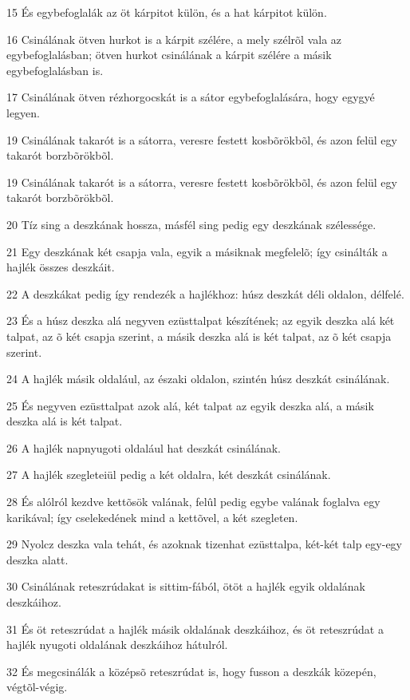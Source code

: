\par 15 És egybefoglalák az öt kárpitot külön, és a hat kárpitot külön.
\par 16 Csinálának ötven hurkot is a kárpit szélére, a mely szélrõl vala az egybefoglalásban; ötven hurkot csinálának a kárpit szélére a másik egybefoglalásban is.
\par 17 Csinálának ötven rézhorgocskát is a sátor egybefoglalására, hogy egygyé legyen.
\par 19 Csinálának takarót is a sátorra, veresre festett kosbõrökbõl, és azon felül egy takarót borzbõrökbõl.
\par 19 Csinálának takarót is a sátorra, veresre festett kosbõrökbõl, és azon felül egy takarót borzbõrökbõl.
\par 20 Tíz sing a deszkának hossza, másfél sing pedig egy deszkának szélessége.
\par 21 Egy deszkának két csapja vala, egyik a másiknak megfelelõ; így csinálták a hajlék összes deszkáit.
\par 22 A deszkákat pedig így rendezék a hajlékhoz: húsz deszkát déli oldalon, délfelé.
\par 23 És a húsz deszka alá negyven ezüsttalpat készítének; az egyik deszka alá két talpat, az õ két csapja szerint, a másik deszka alá is két talpat, az õ két csapja szerint.
\par 24 A hajlék másik oldalául, az északi oldalon, szintén húsz deszkát csinálának.
\par 25 És negyven ezüsttalpat azok alá, két talpat az egyik deszka alá, a másik deszka alá is két talpat.
\par 26 A hajlék napnyugoti oldalául hat deszkát csinálának.
\par 27 A hajlék szegleteiül pedig a két oldalra, két deszkát csinálának.
\par 28 És alólról kezdve kettõsök valának, felûl pedig egybe valának foglalva egy karikával; így cselekedének mind a kettõvel, a két szegleten.
\par 29 Nyolcz deszka vala tehát, és azoknak tizenhat ezüsttalpa, két-két talp egy-egy deszka alatt.
\par 30 Csinálának reteszrúdakat is sittim-fából, ötöt a hajlék egyik oldalának deszkáihoz.
\par 31 És öt reteszrúdat a hajlék másik oldalának deszkáihoz, és öt reteszrúdat a hajlék nyugoti oldalának deszkáihoz hátulról.
\par 32 És megcsinálák a középsõ reteszrúdat is, hogy fusson a deszkák közepén, végtõl-végig.
